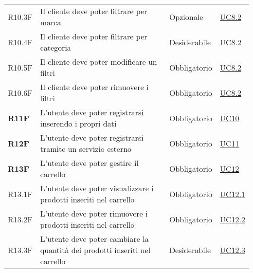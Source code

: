 \begin{center}
\begin{longtable}[!h]{p{50px} p{210px} p{80px} p{50px}}
        R10.3F                                & Il cliente deve poter filtrare per marca                                                            & Opzionale                & \hyperref[sec:UC8.2]{UC8.2}                  \\
        R10.4F                                & Il cliente deve poter filtrare per categoria                                                        & Desiderabile             & \hyperref[sec:UC8.2]{UC8.2}                  \\
        R10.5F                                & Il cliente deve poter modificare un filtri                                                          & Obbligatorio             & \hyperref[sec:UC8.2]{UC8.2}                  \\
        R10.6F                                & Il cliente deve poter rimuovere i filtri                                                            & Obbligatorio             & \hyperref[sec:UC8.2]{UC8.2}                  \\
        \textbf{R11F}                         & L'utente deve poter registrarsi inserendo i propri dati                                             & Obbligatorio             & \hyperref[sec:UC10]{UC10}                    \\
        \textbf{R12F}                         & L'utente deve poter registrarsi tramite un servizio esterno                                         & Obbligatorio             & \hyperref[sec:UC11]{UC11}                    \\
        \textbf{R13F}                         & L'utente deve poter gestire il carrello                                                             & Obbligatorio             & \hyperref[sec:UC12]{UC12}                    \\
        R13.1F                                & L'utente deve poter visualizzare i prodotti inseriti nel carrello                                   & Obbligatorio             & \hyperref[sec:UC12.1]{UC12.1}                \\
        R13.2F                                & L'utente deve poter rimuovere i prodotti inseriti nel carrello                                      & Obbligatorio             & \hyperref[sec:UC12.2]{UC12.2}                \\
        R13.3F                                & L'utente deve poter cambiare la quantità dei prodotti inseriti nel carrello                         & Desiderabile             & \hyperref[sec:UC12.3]{UC12.3}                \\

\end{longtable}
\end{center}

